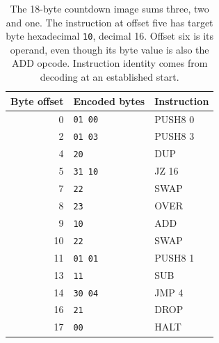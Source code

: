 \begin{table}[!ht]
  \centering
  \begin{tabular}{r l l}
    \toprule
    Byte offset & Encoded bytes  & Instruction \\
    \midrule
    0           & \texttt{01 00} & PUSH8 0     \\
    2           & \texttt{01 03} & PUSH8 3     \\
    4           & \texttt{20}    & DUP         \\
    5           & \texttt{31 10} & JZ 16       \\
    7           & \texttt{22}    & SWAP        \\
    8           & \texttt{23}    & OVER        \\
    9           & \texttt{10}    & ADD         \\
    10          & \texttt{22}    & SWAP        \\
    11          & \texttt{01 01} & PUSH8 1     \\
    13          & \texttt{11}    & SUB         \\
    14          & \texttt{30 04} & JMP 4       \\
    16          & \texttt{21}    & DROP        \\
    17          & \texttt{00}    & HALT        \\
    \bottomrule
  \end{tabular}
  \caption{The 18-byte countdown image sums three, two and one. The instruction at offset five has target byte hexadecimal \texttt{10}, decimal 16. Offset six is its operand, even though its byte value is also the ADD opcode. Instruction identity comes from decoding at an established start.}
  \label{tab:revision-bytecode-countdown}
\end{table}
